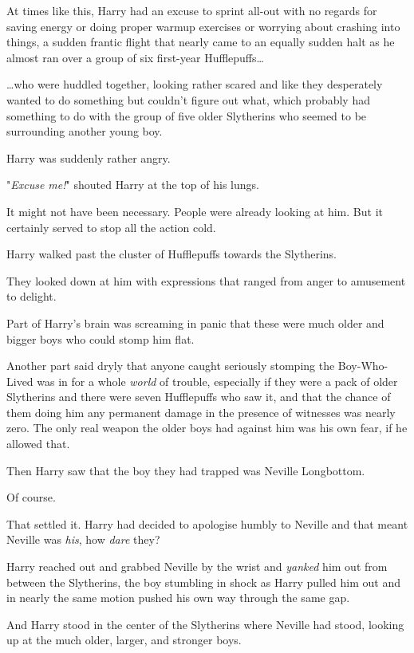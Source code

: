 At times like this, Harry had an excuse to sprint all-out with no regards for 
saving energy or doing proper warmup exercises or worrying about crashing into 
things, a sudden frantic flight that nearly came to an equally sudden halt as 
he almost ran over a group of six first-year Hufflepuffs{\ldots}

{\ldots}who were huddled together, looking rather scared and like they 
desperately wanted to do something but couldn't figure out what, which probably 
had something to do with the group of five older Slytherins who seemed to be 
surrounding another young boy.

Harry was suddenly rather angry.

"\emph{Excuse me!}" shouted Harry at the top of his lungs.

It might not have been necessary. People were already looking at him. But it 
certainly served to stop all the action cold.

Harry walked past the cluster of Hufflepuffs towards the Slytherins.

They looked down at him with expressions that ranged from anger to amusement to 
delight.

Part of Harry's brain was screaming in panic that these were much older and 
bigger boys who could stomp him flat.

Another part said dryly that anyone caught seriously stomping the Boy-Who-Lived 
was in for a whole \emph{world} of trouble, especially if they were a pack of 
older Slytherins and there were seven Hufflepuffs who saw it, and that the 
chance of them doing him any permanent damage in the presence of witnesses was 
nearly zero. The only real weapon the older boys had against him was his own 
fear, if he allowed that.

Then Harry saw that the boy they had trapped was Neville Longbottom.

Of course.

That settled it. Harry had decided to apologise humbly to Neville and that 
meant Neville was \emph{his}, how \emph{dare} they?

Harry reached out and grabbed Neville by the wrist and \emph{yanked} him out 
from between the Slytherins, the boy stumbling in shock as Harry pulled him out 
and in nearly the same motion pushed his own way through the same gap.

And Harry stood in the center of the Slytherins where Neville had stood, 
looking up at the much older, larger, and stronger boys.

